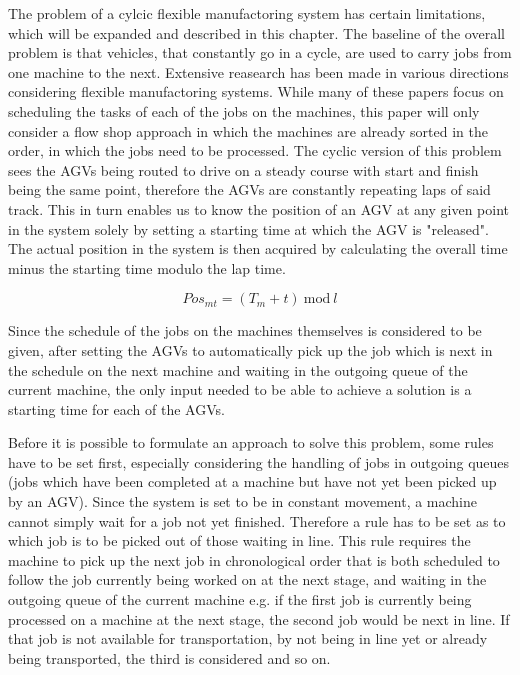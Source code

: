 
The problem of a cylcic flexible manufactoring system has certain limitations, which will be expanded and described in this chapter. The baseline
of the overall problem is that vehicles, that constantly go in a cycle, are used to carry jobs from one machine to the next. Extensive reasearch 
has been made in various directions considering flexible manufactoring systems. While many of these papers focus on scheduling the tasks of each of
the jobs on the machines,
this paper will only consider
a flow shop approach in which the machines are already sorted in the order, in which the jobs need to be processed. The cyclic version of
this problem sees the AGVs being routed to drive on a steady course with start and finish being the same point, therefore the AGVs
are constantly repeating laps of said track. This in turn enables us to know the position of an AGV at any given point in the system solely by
setting a starting time at which the AGV is "released". The actual position in the system is then acquired by calculating the overall time minus
the starting time modulo the lap time.

\[
Pos_{m t} = (T_{m} + t)\>\mathrm{mod}\>l
\]

Since the schedule of the jobs on the machines themselves is considered to be given, after setting the AGVs to automatically pick up the job 
which is next in the schedule on the next machine and waiting in the outgoing queue of the current machine, the only input needed to be able
to achieve a solution is a starting time for each of the AGVs.

Before it is possible to formulate an approach to solve this problem, some rules have to be set first, especially considering the handling of
jobs in outgoing queues (jobs which have been completed at a machine but have not yet been picked up by an AGV). Since the system is set to be
in constant movement, a machine cannot simply wait for a job not yet finished. Therefore a rule has to be set as to which job is to be picked out
of those waiting in line. This rule requires the machine to pick up the next job in chronological order that is both scheduled to follow the job
currently being worked on at the next stage, and waiting in the outgoing queue of the current machine e.g. if the first job is currently being
processed on a machine at the next stage, the second job would be next in line. If that job is not available for transportation, by not being in line yet
or already being transported, the third is considered and so on.


